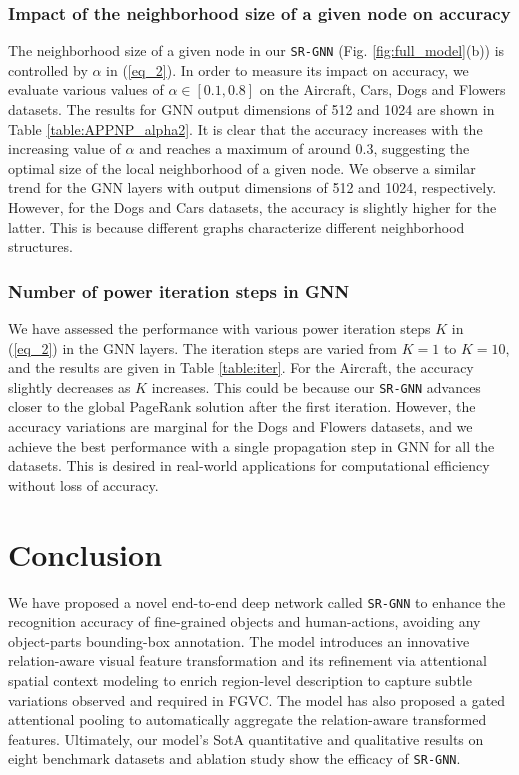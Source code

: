 \documentclass[journal]{IEEEtran}
\begin{document}
\subsubsection{Impact of the neighborhood size of a given node on accuracy}
The neighborhood size of a given node in our \texttt{SR-GNN} (Fig. \ref{fig:full_model}(b)) is controlled by $\alpha$ in (\ref{eq_2}). In order to measure its impact on accuracy, we evaluate various values of $\alpha \in [0.1, 0.8]$ on the Aircraft, Cars, Dogs and Flowers datasets. The results for GNN output dimensions of 512 and 1024 are shown in Table \ref{table:APPNP_alpha2}. It is clear that the accuracy increases with the increasing value of $\alpha$ and reaches a maximum of around 0.3, suggesting the optimal size of the local neighborhood of a given node.  We observe a similar trend for the GNN layers with output dimensions of 512 and 1024, respectively. However, for the Dogs and Cars datasets, the accuracy is slightly higher for the latter. This is because different graphs characterize different neighborhood structures. 

\subsubsection{Number of power iteration steps in GNN}
We have assessed the performance with  various power iteration steps $K$ in (\ref{eq_2}) in the GNN layers. The iteration steps are varied from $K$$=$$1$ to $K$$=$$10$, and the results are given in Table \ref{table:iter}. For the Aircraft, the accuracy slightly decreases as $K$ increases. This could be because our \texttt{SR-GNN} advances closer to the global PageRank solution after the first iteration. However, the accuracy variations are marginal for the Dogs and Flowers datasets, and we achieve the best performance with a single propagation step in GNN for all the datasets. This is desired in real-world applications for computational efficiency without loss of accuracy. 

\vspace{-0.2 cm}
\section{Conclusion} \label {conclusion}
We have proposed a novel end-to-end deep network called \texttt{SR-GNN} to enhance the recognition accuracy of fine-grained objects and human-actions, avoiding any object-parts bounding-box annotation. The model introduces an innovative relation-aware visual feature transformation and its refinement via attentional spatial context modeling to enrich region-level description to capture  subtle variations observed and required in FGVC. The model has also proposed a gated attentional pooling to automatically aggregate the relation-aware transformed features. Ultimately, our model’s SotA quantitative and qualitative results on eight benchmark datasets and ablation study  show the efficacy of \texttt{SR-GNN}. 
\end{document}
